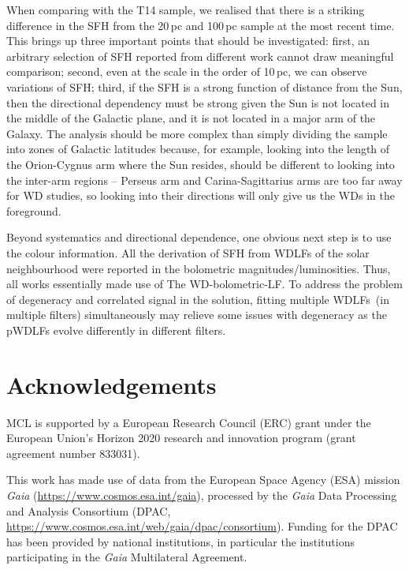 \documentclass[fleqn,usenatbib]{mnras}
\begin{document}
When comparing with the T14 sample, we realised that there is a striking 
difference in the SFH from the 20\,pc and 100\,pc sample at the most recent
time. This brings up three important points that should be investigated: first,
an arbitrary selection of SFH reported from different work cannot draw
meaningful comparison; second, even at the scale in the order of 10\,pc, we
can observe variations of SFH; third, if the SFH is a strong function of distance
from the Sun, then the directional dependency must be strong given the Sun is
not located in the middle of the Galactic plane, and it is not located in a
major arm of the Galaxy. The analysis should be more complex than simply
dividing the sample into zones of Galactic latitudes because, for example,
looking into the length of the Orion-Cygnus arm where the Sun resides, should
be different to looking into the inter-arm regions -- Perseus arm and
Carina-Sagittarius arms are too far away for WD studies, so looking into their
directions will only give us the WDs in the foreground.

Beyond systematics and directional dependence, one obvious next step is to use
the colour information. All the derivation of SFH from WDLFs of the solar 
neighbourhood were reported in the bolometric magnitudes/luminosities. Thus,
all works essentially made use of The WD-bolometric-LF. To address the problem
of degeneracy and correlated signal in the solution, fitting multiple WDLFs~(in 
multiple filters) simultaneously may relieve some issues with degeneracy as the
pWDLFs evolve differently in different filters.

\section*{Acknowledgements}
MCL is supported by a European Research Council (ERC) grant under the European
Union’s Horizon 2020 research and innovation program (grant agreement number
833031).

This work has made use of data from the European Space Agency (ESA) mission
{\it Gaia} (\url{https://www.cosmos.esa.int/gaia}), processed by the {\it Gaia}
Data Processing and Analysis Consortium (DPAC,
\url{https://www.cosmos.esa.int/web/gaia/dpac/consortium}). Funding for the DPAC
has been provided by national institutions, in particular the institutions
participating in the {\it Gaia} Multilateral Agreement.


\end{document}
